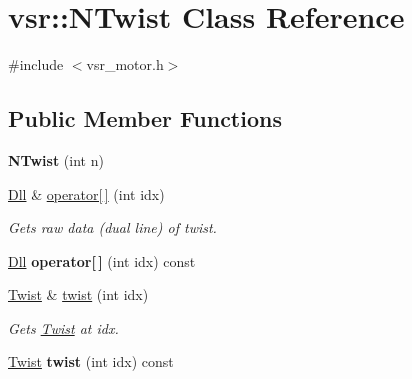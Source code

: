 \hypertarget{classvsr_1_1_n_twist}{\section{vsr\-:\-:N\-Twist Class Reference}
\label{classvsr_1_1_n_twist}
}


{\ttfamily \#include $<$vsr\-\_\-motor.\-h$>$}

\subsection*{Public Member Functions}
\begin{DoxyCompactItemize}
\item 
\hypertarget{classvsr_1_1_n_twist_a6218194239ff76f3ea7a70b63bd1ef17}{{\bfseries N\-Twist} (int n)}\label{classvsr_1_1_n_twist_a6218194239ff76f3ea7a70b63bd1ef17}

\item 
\hypertarget{classvsr_1_1_n_twist_adc9f401c822f0c14747f921a49b6cd6c}{\hyperlink{namespacevsr_a6c6892b7aec25cfb16492501e2e35b11}{Dll} \& \hyperlink{classvsr_1_1_n_twist_adc9f401c822f0c14747f921a49b6cd6c}{operator\mbox{[}$\,$\mbox{]}} (int idx)}\label{classvsr_1_1_n_twist_adc9f401c822f0c14747f921a49b6cd6c}

\begin{DoxyCompactList}\small\item\em Gets raw data (dual line) of twist. \end{DoxyCompactList}\item 
\hypertarget{classvsr_1_1_n_twist_a959640add3526303da0188a1665519fa}{\hyperlink{namespacevsr_a6c6892b7aec25cfb16492501e2e35b11}{Dll} {\bfseries operator\mbox{[}$\,$\mbox{]}} (int idx) const }\label{classvsr_1_1_n_twist_a959640add3526303da0188a1665519fa}

\item 
\hypertarget{classvsr_1_1_n_twist_ac753cd55bc14d862ce1d312b3e10764d}{\hyperlink{classvsr_1_1_twist}{Twist} \& \hyperlink{classvsr_1_1_n_twist_ac753cd55bc14d862ce1d312b3e10764d}{twist} (int idx)}\label{classvsr_1_1_n_twist_ac753cd55bc14d862ce1d312b3e10764d}

\begin{DoxyCompactList}\small\item\em Gets \hyperlink{classvsr_1_1_twist}{Twist} at idx. \end{DoxyCompactList}\item 
\hypertarget{classvsr_1_1_n_twist_a79023a9e7fdae3fe50aad97152f9556d}{\hyperlink{classvsr_1_1_twist}{Twist} {\bfseries twist} (int idx) const }\label{classvsr_1_1_n_twist_a79023a9e7fdae3fe50aad97152f9556d}


\end{DoxyCompactItemize}
